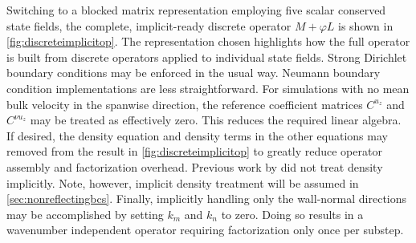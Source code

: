 \documentclass[letterpaper,11pt,nointlimits,reqno,draft]{amsbook}
\begin{document}
Switching to a blocked matrix representation employing five scalar conserved
state fields, the complete, implicit-ready discrete operator $M+\varphi{}L$ is
shown in \autoref{fig:discreteimplicitop}.  The representation chosen
highlights how the full operator is built from discrete operators applied to
individual state fields.  Strong Dirichlet boundary conditions may be enforced
in the usual way.  Neumann boundary condition implementations are less
straightforward.  For simulations with no mean bulk velocity in the spanwise
direction, the reference coefficient matrices $C^{u_z}$ and $C^{\nu{}u_z}$ may
be treated as effectively zero.  This reduces the required linear algebra.  If
desired, the density equation and density terms in the other equations may
removed from the result in \autoref{fig:discreteimplicitop} to greatly
reduce operator assembly and factorization overhead.  Previous work by
\citet{Guarini1998} did not treat density implicitly.  Note, however, implicit
density treatment will be assumed in \autoref{sec:nonreflectingbcs}.
Finally, implicitly handling only the wall-normal directions may be
accomplished by setting $k_{m}$ and $k_{n}$ to zero.  Doing so results in a
wavenumber independent operator requiring factorization only once per substep.
\end{document}
